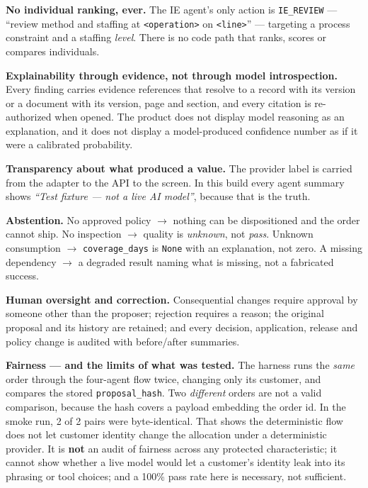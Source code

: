 \documentclass[11pt,a4paper]{article}
\begin{document}
\textbf{No individual ranking, ever.} The IE agent's only action is
\texttt{IE\_REVIEW} --- ``review method and staffing at \texttt{<operation>} on
\texttt{<line>}'' --- targeting a process constraint and a staffing
\emph{level}. There is no code path that ranks, scores or compares individuals.

\textbf{Explainability through evidence, not through model introspection.}
Every finding carries evidence references that resolve to a record with its
version or a document with its version, page and section, and every citation is
re-authorized when opened. The product does not display model reasoning as an
explanation, and it does not display a model-produced confidence number as if it
were a calibrated probability.

\textbf{Transparency about what produced a value.} The provider label is carried
from the adapter to the API to the screen. In this build every agent summary
shows \emph{``Test fixture --- not a live AI model''}, because that is the
truth.

\textbf{Abstention.} No approved policy $\rightarrow$ nothing can be
dispositioned and the order cannot ship. No inspection $\rightarrow$ quality is
\emph{unknown}, not \emph{pass}. Unknown consumption $\rightarrow$
\texttt{coverage\_days} is \texttt{None} with an explanation, not zero. A
missing dependency $\rightarrow$ a degraded result naming what is missing, not a
fabricated success.

\textbf{Human oversight and correction.} Consequential changes require approval
by someone other than the proposer; rejection requires a reason; the original
proposal and its history are retained; and every decision, application, release
and policy change is audited with before/after summaries.

\textbf{Fairness --- and the limits of what was tested.} The harness runs the
\emph{same} order through the four-agent flow twice, changing only its customer,
and compares the stored \texttt{proposal\_hash}. Two \emph{different} orders are
not a valid comparison, because the hash covers a payload embedding the order
id. In the smoke run, 2 of 2 pairs were byte-identical. That shows the
deterministic flow does not let customer identity change the allocation under a
deterministic provider. It is \textbf{not} an audit of fairness across any
protected characteristic; it cannot show whether a live model would let a
customer's identity leak into its phrasing or tool choices; and a 100\% pass
rate here is necessary, not sufficient.
\end{document}
